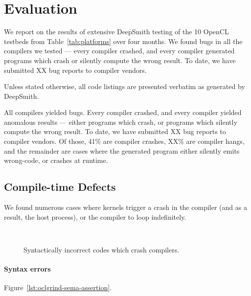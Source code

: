 \section{Evaluation}%
\label{sec:eval}

We report on the results of extensive DeepSmith testing of the 10 OpenCL testbeds from Table~\ref{tab:platforms} over four months. We found bugs in all the compilers we tested --- every compiler crashed, and every compiler generated programs which crash or silently compute the wrong result. To date, we have submitted XX bug reports to compiler vendors. %

Unless stated otherwise, all code listings are presented verbatim as generated by DeepSmith.

 All compilers yielded bugs. Every compiler crashed, and every compiler yielded anomalous results --- either programs which crash, or programs which silently compute the wrong result. To date, we have submitted XX bug reports to compiler vendors. Of those, 41\% are compiler crashes, XX\% are compiler hangs, and the remainder are cases where the generated program either silently emits wrong-code, or crashes at runtime. 


\subsection{Compile-time Defects}%
\label{subsec:compile-time-defects}

We found numerous cases where kernels trigger a crash in the compiler (and as a result, the host process), or the compiler to loop indefinitely.

\begin{figure}
  \centering %
  \\%
  \caption{Syntactically incorrect codes which crash compilers.}
  \label{lst:bad-syntax}
\end{figure}


\paragraph{Syntax errors} Figure~\ref{lst:oclgrind-sema-assertion}.

